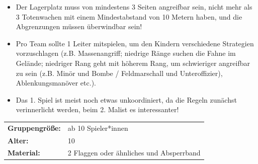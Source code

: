 \begin{itemize}
    \item Der Lagerplatz muss von mindestens 3 Seiten angreifbar sein,    nicht    mehr    als    3    Totenwachen    mit    einem Mindestabstand    von    10    Metern    haben,    und    die Abgrenzungen müssen überwindbar sein!
    \item Pro  Team  sollte  1  Leiter  mitspielen, um  den  Kindern verschiedene Strategien vorzuschlagen (z.B. Massenangriff;   niedrige   Ränge   suchen   die   Fahne   im Gelände;  niedriger  Rang  geht  mit  höherem  Rang,  um schwieriger  angreifbar  zu  sein  (z.B.  Minör  und Bombe  / Feldmarschall und Unteroffizier), Ablenkungsmanöver etc.). 
    \item Das  1.  Spiel  ist  meist  noch  etwas  unkoordiniert,  da  die Regeln zunächst verinnerlicht werden, beim 2. Malist es interessanter!
\end{itemize}



\begin{table}[H]
\begin{tabular}{>{\bfseries}lp{8cm}}
   Gruppengröße:   & ab 10 Spieler*innen\\
    Alter: & 10 \\
    Material: & 2 Flaggen oder ähnliches und Absperrband \\
\end{tabular}
\end{table} 

